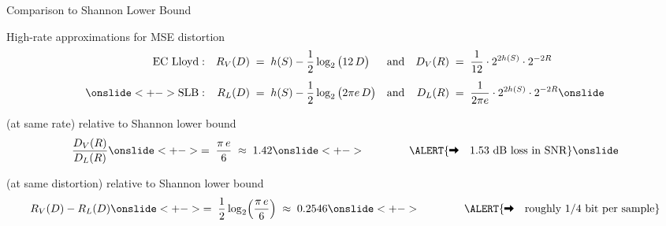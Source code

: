 


\begin{frame}{Comparison to Shannon Lower Bound}
  \bit
\item<+-> High-rate approximations for MSE distortion
  \vspace{-1.0ex}\begin{align*}
    \text{EC Lloyd}:&&
    R_V(D)&\;=\;h(S)-\frac{1}{2}\log_2\big(12\,D\big)
    &&\text{and}&
    D_V(R)&\;=\;\frac{1}{12}\cdot2^{2h(S)}\cdot2^{-2R}\\[1ex]
    \onslide<+->
    \text{SLB}:&&
    R_L(D)&\;=\;h(S)-\frac{1}{2}\log_2\big(2\pi e\,D\big)
    &&\text{and}&
    D_L(R)&\;=\;\frac{1}{2\pi e}\cdot2^{2h(S)}\cdot2^{-2R}
    \onslide
  \end{align*}
\item<+->[\iarrow]\medskip{} (at same rate) relative to Shannon lower bound
  $$
  \frac{D_V(R)}{D_L(R)}
    \onslide<+->
  \;=\;
  \frac{\pi\,e}{6}
  \;\approx\;1.42
    \onslide<+->
  \qquad\qquad\ALERT{\iarrow\quad
  \text{1.53 dB loss in SNR}}
    \onslide
  $$
\item<+->[\iarrow] (at same distortion) relative to Shannon lower bound
  $$
  R_V(D)-R_L(D)
    \onslide<+->
  \;=\;
  \frac{1}{2}\log_2\!\left(\frac{\pi\,e}{6}\right)
  \;\approx\;0.2546
    \onslide<+->
  \qquad\qquad\ALERT{\iarrow\quad
  \text{roughly 1/4 bit per sample}}
  $$
  \eit\vspace{-10ex}
\end{frame}




